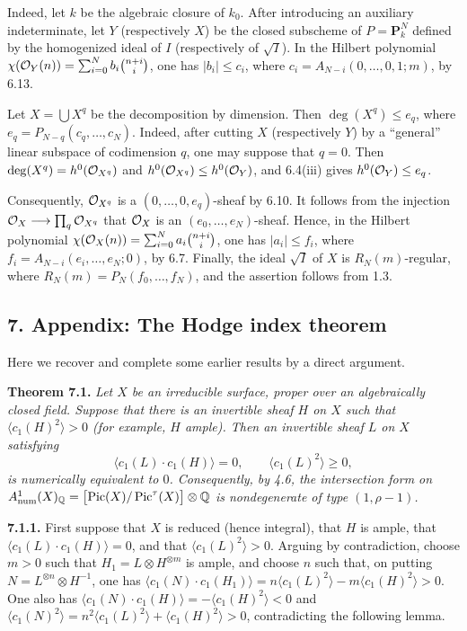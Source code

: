 Indeed, let $k$ be the algebraic closure of $k_0$. After introducing an
auxiliary indeterminate, let $Y$ (respectively $X$) be the closed
subscheme of $P=\mathbf P^N_k$ defined by the homogenized ideal of $I$
(respectively of $\sqrt I$). In the Hilbert polynomial
$\chi(\mathcal O_Y(n))=\sum_{i=0}^{N}b_i\binom{n+i}{i}$, one has
$|b_i|\leq c_i$, where $c_i=A_{N-i}(0,\ldots,0,1;m)$, by 6.13.

Let $X=\bigcup X^q$ be the decomposition by dimension. Then
$\deg(X^q)\leq e_q$, where $e_q=P_{N-q}(c_q,\ldots,c_N)$.
Indeed, after cutting $X$ (respectively $Y$) by a ``general'' linear subspace of codimension $q$, one may suppose that $q=0$. Then
$\deg(X^q)=h^0(\mathcal O_{X^q})$ and
$h^0(\mathcal O_{X^q})\leq h^0(\mathcal O_Y)$, and 6.4(iii) gives
$h^0(\mathcal O_Y)\leq e_q$.

Consequently, $\mathcal O_{X^q}$ is a $(0,\ldots,0,e_q)$-sheaf by 6.10. It
follows from the injection $\mathcal O_X\longrightarrow\prod_q\mathcal O_{X^q}$ that
$\mathcal O_X$ is an $(e_0,\ldots,e_N)$-sheaf. Hence, in the Hilbert polynomial
$\chi(\mathcal O_X(n))=\sum_{i=0}^{N}a_i\binom{n+i}{i}$, one has
$|a_i|\leq f_i$, where $f_i=A_{N-i}(e_i,\ldots,e_N;0)$, by 6.7.
Finally, the ideal $\sqrt I$ of $X$ is $R_N(m)$-regular, where
$R_N(m)=P_N(f_0,\ldots,f_N)$, and the assertion follows from 1.3.

\subsection*{7. Appendix: The Hodge index theorem}

Here we recover and complete some earlier results by a direct argument.

\textbf{Theorem 7.1.} \emph{Let $X$ be an irreducible surface, proper
over an algebraically closed field. Suppose that there is an invertible
sheaf $H$ on $X$ such that $\langle c_1(H)^2\rangle>0$ (for example,
$H$ ample). Then an invertible sheaf $L$ on $X$ satisfying
\[
  \langle c_1(L)\cdot c_1(H)\rangle=0,
  \qquad
  \langle c_1(L)^2\rangle\geq0,
\]
is numerically equivalent to $0$. Consequently, by 4.6, the intersection
form on $A^1_{\mathrm{num}}(X)_{\mathbb Q}
=\bigl[\operatorname{Pic}(X)/\operatorname{Pic}^\tau(X)\bigr]\otimes\mathbb Q$ is nondegenerate of type
$(1,\rho-1)$.}

\textbf{7.1.1.} First suppose that $X$ is reduced (hence integral), that
$H$ is ample, that $\langle c_1(L)\cdot c_1(H)\rangle=0$, and that
$\langle c_1(L)^2\rangle>0$. Arguing by contradiction, choose $m>0$
such that $H_1=L\otimes H^{\otimes m}$ is ample, and choose $n$ such
that, on putting $N=L^{\otimes n}\otimes H^{-1}$, one has
$\langle c_1(N)\cdot c_1(H_1)\rangle
=n\langle c_1(L)^2\rangle-m\langle c_1(H)^2\rangle>0$. One also has
$\langle c_1(N)\cdot c_1(H)\rangle=-\langle c_1(H)^2\rangle<0$ and
$\langle c_1(N)^2\rangle
=n^2\langle c_1(L)^2\rangle+\langle c_1(H)^2\rangle>0$, contradicting
the following lemma.

